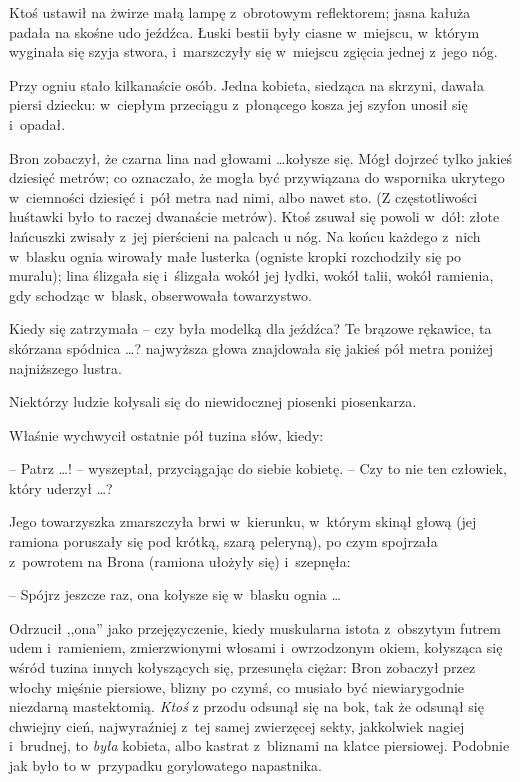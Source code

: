 \documentclass[oneside,polish,11pt,rmheadings]{mwbk}
\begin{document}
Ktoś ustawił na żwirze małą lampę z~obrotowym reflektorem; jasna kałuża padała na skośne udo jeźdźca. Łuski bestii były ciasne w~miejscu, w~którym wyginała się szyja stwora, i~marszczyły się w~miejscu zgięcia jednej z~jego nóg. 

Przy ogniu stało kilkanaście osób. Jedna kobieta, siedząca na skrzyni, dawała piersi dziecku: w~ciepłym przeciągu z~płonącego kosza jej szyfon unosił się i~opadał. 

Bron zobaczył, że czarna lina nad głowami \ldots  kołysze się. Mógł dojrzeć tylko jakieś dziesięć metrów; co oznaczało, że mogła być przywiązana do wspornika ukrytego w~ciemności dziesięć i~pół metra nad nimi, albo nawet sto. (Z częstotliwości huśtawki było to raczej dwanaście metrów). Ktoś zsuwał się powoli w~dół: złote łańcuszki zwisały z~jej pierścieni na palcach u nóg. Na końcu każdego z~nich w~blasku ognia wirowały małe lusterka (ogniste kropki rozchodziły się po muralu); lina ślizgała się i~ślizgała wokół jej łydki, wokół talii, wokół ramienia, gdy schodząc w~blask, obserwowała towarzystwo. 

Kiedy się zatrzymała -- czy była modelką dla jeźdźca? Te brązowe rękawice, ta skórzana spódnica \ldots ? najwyższa głowa znajdowała się jakieś pół metra poniżej najniższego lustra. 

Niektórzy ludzie kołysali się do niewidocznej piosenki piosenkarza.  

Właśnie wychwycił ostatnie pół tuzina słów, kiedy: 

-- Patrz \ldots ! -- wyszeptał, przyciągając do siebie kobietę. -- Czy to nie ten człowiek, który uderzył \ldots ? 

Jego towarzyszka zmarszczyła brwi w~kierunku, w~którym skinął głową (jej ramiona poruszały się pod krótką, szarą peleryną), po czym spojrzała z~powrotem na Brona (ramiona ułożyły się) i~szepnęła: 

-- Spójrz jeszcze raz, ona kołysze się w~blasku ognia \ldots  

Odrzucił ,,ona'' jako przejęzyczenie, kiedy muskularna istota z~obszytym futrem udem i~ramieniem, zmierzwionymi włosami i~owrzodzonym okiem, kołysząca się wśród tuzina innych kołyszących się, przesunęła ciężar: Bron zobaczył przez włochy mięśnie piersiowe, blizny po czymś, co musiało być niewiarygodnie niezdarną mastektomią. \textit{Ktoś }z przodu odsunął się na bok, tak że odsunął się chwiejny cień, najwyraźniej z~tej samej zwierzęcej sekty, jakkolwiek nagiej i~brudnej, to \textit{była } kobieta, albo kastrat z~bliznami na klatce piersiowej. Podobnie jak było to w~przypadku gorylowatego napastnika. 
\end{document}
